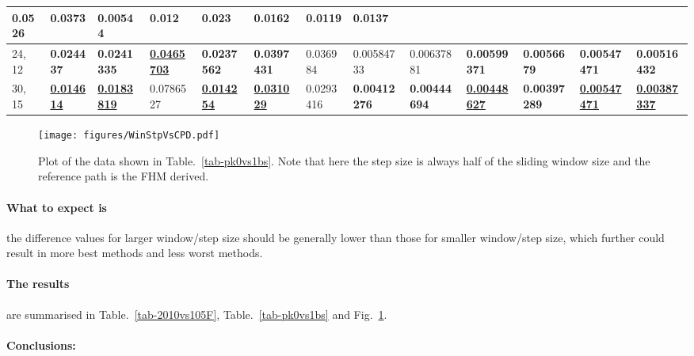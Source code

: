 \begin{table*}
{\begin{tabular}{|l|l|l|l|l|l|l|l|l|l|l|l|l|}
{  \textbf{0.0526}} & 0.0373 & 0.00544 & 0.012 &
  0.023 & 0.0162 & 0.0119 & 0.0137 \\ \hline
24, 12 & {\color[HTML]{32CB00} \textbf{0.024437}} & {\color[HTML]{32CB00} \textbf{0.0241335}} & {\color[HTML]{009901} {\ul \textbf{0.0465703}}} & {\color[HTML]{32CB00} \textbf{0.0237562}} & {\color[HTML]{32CB00} \textbf{0.0397431}} & 0.036984 & 0.00584733 & 0.00637881 & {\color[HTML]{32CB00} \textbf{0.00599371}} & {\color[HTML]{34FF34} \textbf{0.0056679}} & {\color[HTML]{32CB00} \textbf{0.00547471}} & {\color[HTML]{32CB00} \textbf{0.00516432}} \\ \hline
30, 15 & {\color[HTML]{009901} {\ul \textbf{0.014614}}} & {\color[HTML]{009901}
  {\ul \textbf{0.0183819}}} & 0.0786527 & {\color[HTML]{009901} {\ul
  \textbf{0.014254}}} & {\color[HTML]{009901} {\ul \textbf{0.031029}}} &
  0.0293416 & {\color[HTML]{32CB00} \textbf{0.00412276}} &
  {\color[HTML]{34FF34} \textbf{0.00444694}} & {\color[HTML]{009901} {\ul
  \textbf{0.00448627}}} & {\color[HTML]{32CB00} \textbf{0.00397289}} &
  {\color[HTML]{009901} {\ul \textbf{0.00547471}}} & {\color[HTML]{009901} {\ul \textbf{0.00387337}}} \\ \hline
\end{tabular}%
}
\end{table*}

\begin{figure}
\centering
\texttt{[image: figures/WinStpVsCPD.pdf]}
\caption[Sliding window and step sizes versus CPD]{Plot of the data shown in
  Table.~\ref{tab-pk0vs1bs}. Note that here the step size is always half of the
  sliding window size and the reference path is the FHM
  derived.}\label{fig-WinStpVsCPD}
\end{figure}

\paragraph{What to expect is}
the difference values for larger window/step size should be generally lower than
those for smaller window/step size, which further could result in more best
methods and less worst methods.

\paragraph{The results}
are summarised in Table.~\ref{tab-2010vs105F}, Table.~\ref{tab-pk0vs1bs} and
Fig.~\ref{fig-WinStpVsCPD}.

\paragraph{Conclusions:}

